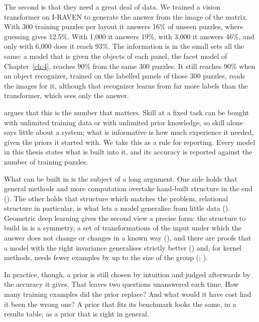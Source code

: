 The second is that they need a great deal of data. We trained a vision transformer on I-RAVEN to generate the answer from the image of the matrix. With 300 training puzzles per layout it answers 16\% of unseen puzzles, where guessing gives 12.5\%. With 1,000 it answers 19\%, with 3,000 it answers 46\%, and only with 6,000 does it reach 93\%. The information is in the small sets all the same: a model that is given the objects of each panel, the facet model of Chapter~\ref{ch:4}, reaches 90\% from the same 300 puzzles. It still reaches 90\% when an object recognizer, trained on the labelled panels of those 300 puzzles, reads the images for it, although that recognizer learns from far more labels than the transformer, which sees only the answer.

\citet{chollet2019measure} argues that this is the number that matters. Skill at a fixed task can be bought with unlimited training data or with unlimited prior knowledge, so skill alone says little about a system; what is informative is how much experience it needed, given the priors it started with. We take this as a rule for reporting. Every model in this thesis states what is built into it, and its accuracy is reported against the number of training puzzles.

What can be built in is the subject of a long argument. One side holds that general methods and more computation overtake hand-built structure in the end (\citealp{sutton2019bitter}). The other holds that structure which matches the problem, relational structure in particular, is what lets a model generalise from little data (\citealp{battaglia2018relational}). Geometric deep learning gives the second view a precise form: the structure to build in is a symmetry, a set of transformations of the input under which the answer does not change or changes in a known way (\citealp{bronstein2021geometric}), and there are proofs that a model with the right invariance generalises strictly better (\citealp{elesedy2021provably}) and, for kernel methods, needs fewer examples by up to the size of the group (\citealp{bietti2021sample}; \citealp{tahmasebi2023exact}).

In practice, though, a prior is still chosen by intuition and judged afterwards by the accuracy it gives. That leaves two questions unanswered each time. How many training examples did the prior replace? And what would it have cost had it been the wrong one? A prior that fits its benchmark looks the same, in a results table, as a prior that is right in general.


